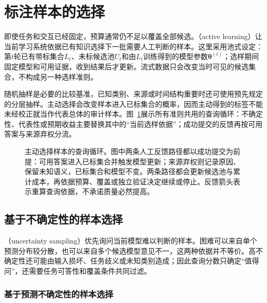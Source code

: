 \section{标注样本的选择}
\label{sec:knowledge-acquisition-human-sample-selection}

即使任务和交互已经固定，预算通常仍不足以覆盖全部候选。（active learning）让当前学习系统依据已有知识选择下一批需要人工判断的样本。这里采用池式设定：第$t$轮已有带标集合$L_t$、未标候选池$U_t$和由$L_t$训练得到的模型参数$\bm{\theta}^{(t)}$；选样期间固定模型和可用证据，收到结果后才更新。流式数据只会改变当时可见的候选集合，不构成另一种选样准则。

随机抽样是必要的比较基准，已知类别、来源或时间结构重要时还可使用预先规定的分层抽样。主动选择会改变样本进入已标集合的概率，因而主动得到的标签不能未经校正就当作代表总体的审计样本。图~\ref{fig:knowledge-acquisition-human-query-loop}展示所有准则共用的查询循环：不确定性、代表性或预期收益主要替换其中的“当前选样依据”；成功提交的反馈再按可用答案与来源弃权分流。

\begin{figure}[htbp]
  \centering
  
  \caption{主动选择样本的查询循环。图中两条人工反馈路径都以成功提交为前提：可用答案进入已标集合并触发模型更新；来源弃权则记录原因、保留未知语义，已标集合和模型不变。两条路径都会更新候选池与累计成本，再依据预算、覆盖或独立验证决定继续或停止。反馈箭头表示重算查询依据，不承诺质量必然提高。}
  \label{fig:knowledge-acquisition-human-query-loop}
\end{figure}

\subsection{基于不确定性的样本选择}
\label{sec:knowledge-acquisition-human-uncertainty-selection}

（uncertainty sampling）优先询问当前模型难以判断的样本。困难可以来自单个预测分布较分散，也可以来自多个候选模型意见不一，这两种依据并不等价。高不确定性还可能由输入损坏、任务歧义或未知类别造成；因此查询分数只确定“值得问”，还需要任务可答性和覆盖条件共同过滤。

\subsubsection{基于预测不确定性的样本选择}
\label{sec:knowledge-acquisition-human-predictive-uncertainty}

